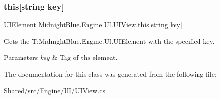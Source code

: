 \subsubsection{\texorpdfstring{this[string key]}{this[string key]}}
{\footnotesize\ttfamily \hyperlink{class_midnight_blue_1_1_engine_1_1_u_i_1_1_u_i_element}{U\+I\+Element} Midnight\+Blue.\+Engine.\+U\+I.\+U\+I\+View.\+this\mbox{[}string key\mbox{]}\hspace{0.3cm}{\ttfamily [get]}}



Gets the T\+:\+Midnight\+Blue.\+Engine.\+U\+I.\+U\+I\+Element with the specified key. 


\begin{DoxyParams}{Parameters}
{\em key} & Tag of the element.\\
\hline
\end{DoxyParams}


The documentation for this class was generated from the following file\+:\begin{DoxyCompactItemize}
\item 
Shared/src/\+Engine/\+U\+I/U\+I\+View.\+cs\end{DoxyCompactItemize}
